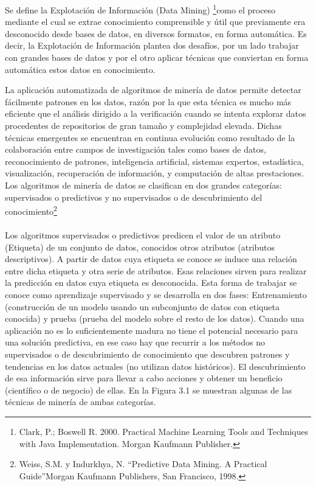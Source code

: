 \documentclass[a4paper,openright,12pt]{book}
\theoremstyle{definition}
\theoremstyle{remark}
\begin{document}
Se define la Explotación de Información (Data Mining) \footnote{Clark, P.; Boswell R. 2000. Practical Machine
Learning Tools and Techniques with Java
Implementation. Morgan Kaufmann Publisher.}como el proceso mediante el cual se extrae conocimiento comprensible y útil que previamente era desconocido desde bases de datos, en diversos formatos, en forma automática. Es decir,
la Explotación de Información plantea dos desafíos, por un lado trabajar con grandes bases de datos y por el otro aplicar técnicas que conviertan en forma automática estos datos en conocimiento.

La aplicación automatizada de algoritmos de minería de datos permite detectar fácilmente patrones en los datos, razón por la que esta técnica es mucho más eficiente que el análisis dirigido a la verificación cuando se intenta explorar datos procedentes de repositorios de gran tamaño y complejidad elevada. Dichas técnicas emergentes se encuentran en continua evolución como resultado de la colaboración entre campos de investigación tales como bases de datos, reconocimiento de patrones, inteligencia artificial, sistemas expertos, estadística, visualización, recuperación de información, y computación de altas prestaciones. Los algoritmos de minería de datos se clasifican en dos grandes categorías: supervisados o predictivos y no supervisados o de descubrimiento del conocimiento\footnote{Weiss, S.M. y Indurkhya, N. “Predictive Data Mining. A Practical Guide”Morgan Kaufmann Publishers, San Francisco, 1998.}\\\\
Los algoritmos supervisados o predictivos predicen el valor de un atributo (Etiqueta) de un conjunto de datos, conocidos otros atributos (atributos descriptivos). A partir de datos cuya etiqueta se conoce se induce una relación entre dicha etiqueta y otra serie de atributos. Esas relaciones sirven para realizar la predicción en datos cuya etiqueta es desconocida. Esta forma de trabajar se conoce como aprendizaje supervisado y se desarrolla en dos fases: Entrenamiento (construcción de un modelo usando un subconjunto de datos con etiqueta conocida) y prueba (prueba del modelo sobre el resto de los datos). Cuando una aplicación no es lo suficientemente madura no tiene el potencial necesario para una solución predictiva, en ese caso hay que recurrir a los métodos no supervisados o de descubrimiento de  conocimiento que descubren patrones y tendencias en los datos actuales (no utilizan datos históricos). El descubrimiento de esa información sirve para llevar a cabo acciones y obtener un beneficio (científico o de negocio) de ellas. En la Figura 3.1 se muestran algunas de las técnicas de minería de ambas categorías.
\end{document}
